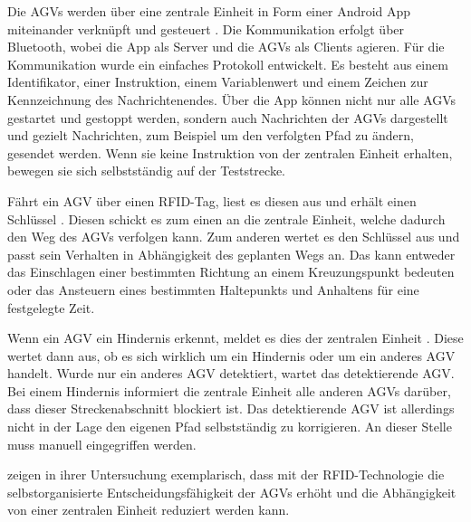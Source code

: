 Die AGVs werden über eine zentrale Einheit in Form einer Android App miteinander verknüpft und gesteuert \parencite{rfid}. Die Kommunikation erfolgt über Bluetooth, wobei die App als Server und die AGVs als Clients agieren. Für die Kommunikation wurde ein einfaches Protokoll entwickelt. Es besteht aus einem Identifikator, einer Instruktion, einem Variablenwert und einem Zeichen zur Kennzeichnung des Nachrichtenendes. Über die App können nicht nur alle AGVs gestartet und gestoppt werden, sondern auch Nachrichten der AGVs dargestellt und gezielt Nachrichten, zum Beispiel um den verfolgten Pfad zu ändern, gesendet werden. Wenn sie keine Instruktion von der zentralen Einheit erhalten, bewegen sie sich selbstständig auf der Teststrecke.

Fährt ein AGV über einen RFID-Tag, liest es diesen aus und erhält einen Schlüssel \parencite{rfid}. Diesen schickt es zum einen an die zentrale Einheit, welche dadurch den Weg des AGVs verfolgen kann. Zum anderen wertet es den Schlüssel aus und passt sein Verhalten in Abhängigkeit des geplanten Wegs an. Das kann entweder das Einschlagen einer bestimmten Richtung an einem Kreuzungspunkt bedeuten oder das Ansteuern eines bestimmten Haltepunkts und Anhaltens für eine festgelegte Zeit.

Wenn ein AGV ein Hindernis erkennt, meldet es dies der zentralen Einheit \parencite{rfid}. Diese wertet dann aus, ob es sich wirklich um ein Hindernis oder um ein anderes AGV handelt. Wurde nur ein anderes AGV detektiert, wartet das detektierende AGV. Bei einem Hindernis informiert die zentrale Einheit alle anderen AGVs darüber, dass dieser Streckenabschnitt blockiert ist. Das detektierende AGV ist allerdings nicht in der Lage den eigenen Pfad selbstständig zu korrigieren. An dieser Stelle muss manuell eingegriffen werden. 

\textcite{rfid} zeigen in ihrer Untersuchung exemplarisch, dass mit der RFID-Technologie die selbstorganisierte Entscheidungsfähigkeit der AGVs erhöht und die Abhängigkeit von einer zentralen Einheit reduziert werden kann.